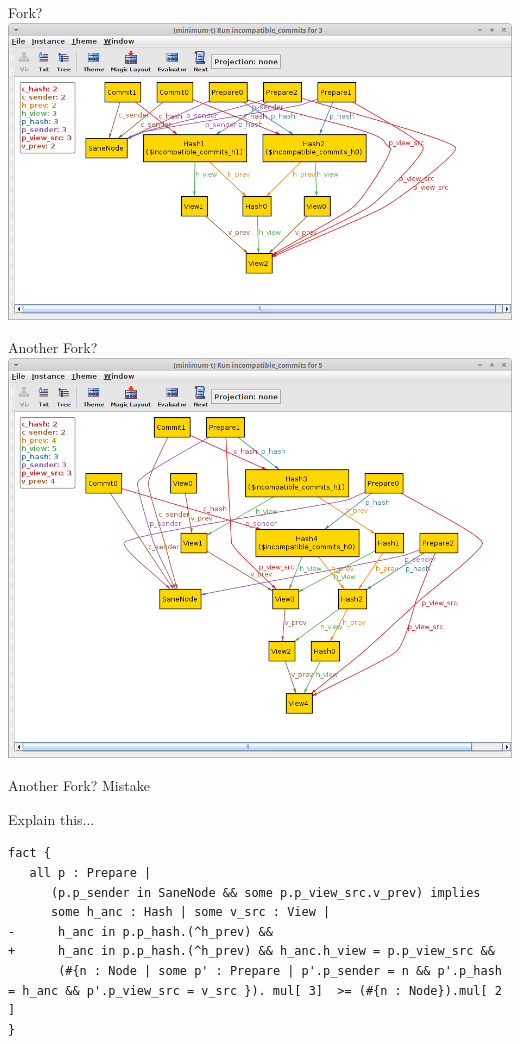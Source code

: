 \documentclass{beamer}
\begin{document}
\begin{frame}{Fork?}
\includegraphics[width=\textwidth]{fork.png}

\end{frame}

\begin{frame}{Another Fork?}
\includegraphics[width=\textwidth]{fork2.png}
\end{frame}

\begin{frame}[fragile]{Another Fork?  Mistake}

Explain this...

\begin{verbatim}
fact {
   all p : Prepare |
      (p.p_sender in SaneNode && some p.p_view_src.v_prev) implies
      some h_anc : Hash | some v_src : View |
-      h_anc in p.p_hash.(^h_prev) &&
+      h_anc in p.p_hash.(^h_prev) && h_anc.h_view = p.p_view_src &&
       (#{n : Node | some p' : Prepare | p'.p_sender = n && p'.p_hash = h_anc && p'.p_view_src = v_src }). mul[ 3]  >= (#{n : Node}).mul[ 2 ]
}
\end{verbatim}
\end{frame}
\end{document}
